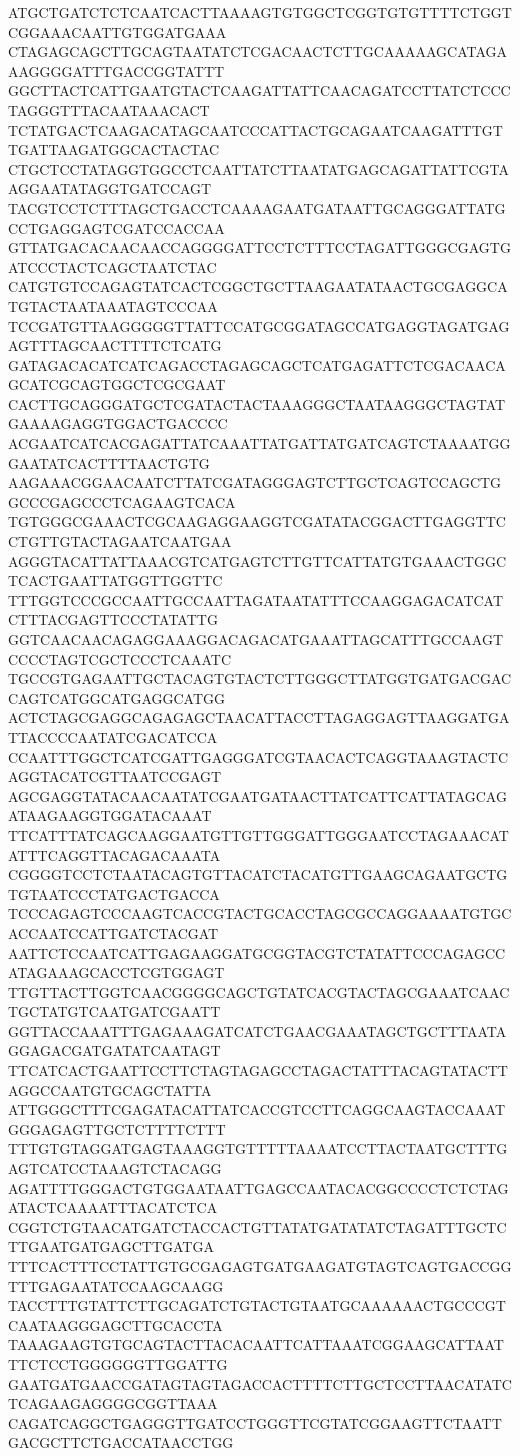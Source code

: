 ATGCTGATCTCTCAATCACTTAAAAGTGTGGCTCGGTGTGTTTTCTGGTCGGAAACAATTGTGGATGAAA
CTAGAGCAGCTTGCAGTAATATCTCGACAACTCTTGCAAAAAGCATAGAAAGGGGATTTGACCGGTATTT
GGCTTACTCATTGAATGTACTCAAGATTATTCAACAGATCCTTATCTCCCTAGGGTTTACAATAAACACT
TCTATGACTCAAGACATAGCAATCCCATTACTGCAGAATCAAGATTTGTTGATTAAGATGGCACTACTAC
CTGCTCCTATAGGTGGCCTCAATTATCTTAATATGAGCAGATTATTCGTAAGGAATATAGGTGATCCAGT
TACGTCCTCTTTAGCTGACCTCAAAAGAATGATAATTGCAGGGATTATGCCTGAGGAGTCGATCCACCAA
GTTATGACACAACAACCAGGGGATTCCTCTTTCCTAGATTGGGCGAGTGATCCCTACTCAGCTAATCTAC
CATGTGTCCAGAGTATCACTCGGCTGCTTAAGAATATAACTGCGAGGCATGTACTAATAAATAGTCCCAA
TCCGATGTTAAGGGGGTTATTCCATGCGGATAGCCATGAGGTAGATGAGAGTTTAGCAACTTTTCTCATG
GATAGACACATCATCAGACCTAGAGCAGCTCATGAGATTCTCGACAACAGCATCGCAGTGGCTCGCGAAT
CACTTGCAGGGATGCTCGATACTACTAAAGGGCTAATAAGGGCTAGTATGAAAAGAGGTGGACTGACCCC
ACGAATCATCACGAGATTATCAAATTATGATTATGATCAGTCTAAAATGGGAATATCACTTTTAACTGTG
AAGAAACGGAACAATCTTATCGATAGGGAGTCTTGCTCAGTCCAGCTGGCCCGAGCCCTCAGAAGTCACA
TGTGGGCGAAACTCGCAAGAGGAAGGTCGATATACGGACTTGAGGTTCCTGTTGTACTAGAATCAATGAA
AGGGTACATTATTAAACGTCATGAGTCTTGTTCATTATGTGAAACTGGCTCACTGAATTATGGTTGGTTC
TTTGGTCCCGCCAATTGCCAATTAGATAATATTTCCAAGGAGACATCATCTTTACGAGTTCCCTATATTG
GGTCAACAACAGAGGAAAGGACAGACATGAAATTAGCATTTGCCAAGTCCCCTAGTCGCTCCCTCAAATC
TGCCGTGAGAATTGCTACAGTGTACTCTTGGGCTTATGGTGATGACGACCAGTCATGGCATGAGGCATGG
ACTCTAGCGAGGCAGAGAGCTAACATTACCTTAGAGGAGTTAAGGATGATTACCCCAATATCGACATCCA
CCAATTTGGCTCATCGATTGAGGGATCGTAACACTCAGGTAAAGTACTCAGGTACATCGTTAATCCGAGT
AGCGAGGTATACAACAATATCGAATGATAACTTATCATTCATTATAGCAGATAAGAAGGTGGATACAAAT
TTCATTTATCAGCAAGGAATGTTGTTGGGATTGGGAATCCTAGAAACATATTTCAGGTTACAGACAAATA
CGGGGTCCTCTAATACAGTGTTACATCTACATGTTGAAGCAGAATGCTGTGTAATCCCTATGACTGACCA
TCCCAGAGTCCCAAGTCACCGTACTGCACCTAGCGCCAGGAAAATGTGCACCAATCCATTGATCTACGAT
AATTCTCCAATCATTGAGAAGGATGCGGTACGTCTATATTCCCAGAGCCATAGAAAGCACCTCGTGGAGT
TTGTTACTTGGTCAACGGGGCAGCTGTATCACGTACTAGCGAAATCAACTGCTATGTCAATGATCGAATT
GGTTACCAAATTTGAGAAAGATCATCTGAACGAAATAGCTGCTTTAATAGGAGACGATGATATCAATAGT
TTCATCACTGAATTCCTTCTAGTAGAGCCTAGACTATTTACAGTATACTTAGGCCAATGTGCAGCTATTA
ATTGGGCTTTCGAGATACATTATCACCGTCCTTCAGGCAAGTACCAAATGGGAGAGTTGCTCTTTTCTTT
TTTGTGTAGGATGAGTAAAGGTGTTTTTAAAATCCTTACTAATGCTTTGAGTCATCCTAAAGTCTACAGG
AGATTTTGGGACTGTGGAATAATTGAGCCAATACACGGCCCCTCTCTAGATACTCAAAATTTACATCTCA
CGGTCTGTAACATGATCTACCACTGTTATATGATATATCTAGATTTGCTCTTGAATGATGAGCTTGATGA
TTTCACTTTCCTATTGTGCGAGAGTGATGAAGATGTAGTCAGTGACCGGTTTGAGAATATCCAAGCAAGG
TACCTTTGTATTCTTGCAGATCTGTACTGTAATGCAAAAAACTGCCCGTCAATAAGGGAGCTTGCACCTA
TAAAGAAGTGTGCAGTACTTACACAATTCATTAAATCGGAAGCATTAATTTCTCCTGGGGGGTTGGATTG
GAATGATGAACCGATAGTAGTAGACCACTTTTCTTGCTCCTTAACATATCTCAGAAGAGGGGCGGTTAAA
CAGATCAGGCTGAGGGTTGATCCTGGGTTCGTATCGGAAGTTCTAATTGACGCTTCTGACCATAACCTGG
